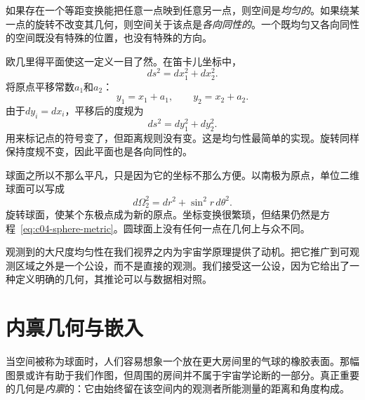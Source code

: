 \begin{definition}
如果存在一个等距变换能把任意一点映到任意另一点，则空间是\emph{均匀的}。如果绕某一点的旋转不改变其几何，则空间关于该点是\emph{各向同性的}。一个既均匀又各向同性的空间既没有特殊的位置，也没有特殊的方向。
\end{definition}

欧几里得平面使这一定义一目了然。在笛卡儿坐标中，
\begin{equation}
ds^2=dx_1^2+dx_2^2.
\label{eq:c04-flat-metric}
\end{equation}
将原点平移常数\(a_1\)和\(a_2\)：
\begin{equation}
y_1=x_1+a_1,
\qquad
y_2=x_2+a_2.
\label{eq:c04-flat-translation}
\end{equation}
由于\(dy_i=dx_i\)，平移后的度规为
\begin{equation}
ds^2=dy_1^2+dy_2^2.
\end{equation}
用来标记点的符号变了，但距离规则没有变。这是均匀性最简单的实现。旋转同样保持度规不变，因此平面也是各向同性的。

球面之所以不那么平凡，只是因为它的坐标不那么方便。以南极为原点，单位二维球面可以写成
\begin{equation}
d\Omega_2^2=dr^2+\sin^2 r\,d\theta^2.
\label{eq:c04-sphere-metric}
\end{equation}
旋转球面，使某个东极点成为新的原点。坐标变换很繁琐，但结果仍然是方程~\eqref{eq:c04-sphere-metric}。圆球面上没有任何一点在几何上与众不同。

\begin{classroomqa}
\end{classroomqa}

观测到的大尺度均匀性在我们视界之内为宇宙学原理提供了动机。把它推广到可观测区域之外是一个公设，而不是直接的观测。我们接受这一公设，因为它给出了一种定义明确的几何，其推论可以与数据相对照。

\section{内禀几何与嵌入}

当空间被称为球面时，人们容易想象一个放在更大房间里的气球的橡胶表面。那幅图景或许有助于我们作图，但周围的房间并不属于宇宙学论断的一部分。真正重要的几何是\emph{内禀}的：它由始终留在该空间内的观测者所能测量的距离和角度构成。

